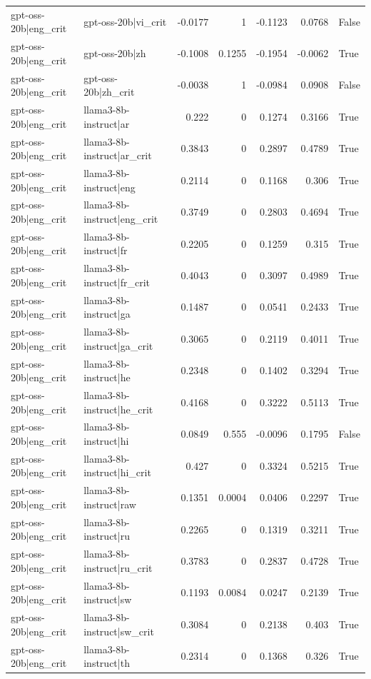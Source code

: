 \begin{table}
\begin{tabular}{l l r r r r l}
gpt-oss-20b|eng_crit & gpt-oss-20b|vi_crit & -0.0177 & 1 & -0.1123 & 0.0768 & False \\
gpt-oss-20b|eng_crit & gpt-oss-20b|zh & -0.1008 & 0.1255 & -0.1954 & -0.0062 & True \\
gpt-oss-20b|eng_crit & gpt-oss-20b|zh_crit & -0.0038 & 1 & -0.0984 & 0.0908 & False \\
gpt-oss-20b|eng_crit & llama3-8b-instruct|ar & 0.222 & 0 & 0.1274 & 0.3166 & True \\
gpt-oss-20b|eng_crit & llama3-8b-instruct|ar_crit & 0.3843 & 0 & 0.2897 & 0.4789 & True \\
gpt-oss-20b|eng_crit & llama3-8b-instruct|eng & 0.2114 & 0 & 0.1168 & 0.306 & True \\
gpt-oss-20b|eng_crit & llama3-8b-instruct|eng_crit & 0.3749 & 0 & 0.2803 & 0.4694 & True \\
gpt-oss-20b|eng_crit & llama3-8b-instruct|fr & 0.2205 & 0 & 0.1259 & 0.315 & True \\
gpt-oss-20b|eng_crit & llama3-8b-instruct|fr_crit & 0.4043 & 0 & 0.3097 & 0.4989 & True \\
gpt-oss-20b|eng_crit & llama3-8b-instruct|ga & 0.1487 & 0 & 0.0541 & 0.2433 & True \\
gpt-oss-20b|eng_crit & llama3-8b-instruct|ga_crit & 0.3065 & 0 & 0.2119 & 0.4011 & True \\
gpt-oss-20b|eng_crit & llama3-8b-instruct|he & 0.2348 & 0 & 0.1402 & 0.3294 & True \\
gpt-oss-20b|eng_crit & llama3-8b-instruct|he_crit & 0.4168 & 0 & 0.3222 & 0.5113 & True \\
gpt-oss-20b|eng_crit & llama3-8b-instruct|hi & 0.0849 & 0.555 & -0.0096 & 0.1795 & False \\
gpt-oss-20b|eng_crit & llama3-8b-instruct|hi_crit & 0.427 & 0 & 0.3324 & 0.5215 & True \\
gpt-oss-20b|eng_crit & llama3-8b-instruct|raw & 0.1351 & 0.0004 & 0.0406 & 0.2297 & True \\
gpt-oss-20b|eng_crit & llama3-8b-instruct|ru & 0.2265 & 0 & 0.1319 & 0.3211 & True \\
gpt-oss-20b|eng_crit & llama3-8b-instruct|ru_crit & 0.3783 & 0 & 0.2837 & 0.4728 & True \\
gpt-oss-20b|eng_crit & llama3-8b-instruct|sw & 0.1193 & 0.0084 & 0.0247 & 0.2139 & True \\
gpt-oss-20b|eng_crit & llama3-8b-instruct|sw_crit & 0.3084 & 0 & 0.2138 & 0.403 & True \\
gpt-oss-20b|eng_crit & llama3-8b-instruct|th & 0.2314 & 0 & 0.1368 & 0.326 & True \\

\end{tabular}
\end{table}
